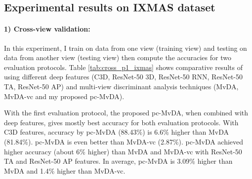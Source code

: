 
\subsection{Experimental results on IXMAS dataset}
    \paragraph{1) Cross-view validation:} In this experiment, I train on data from one view (training view) and testing on data from another view (testing view) then compute the accuracies for two evaluation protocols. Table \ref{tab:cross_p1_ixmas} shows comparative results of using different deep features (C3D, ResNet-50 3D, ResNet-50 RNN, ResNet-50 TA, ResNet-50 AP) and multi-view discriminant analysis techniques (MvDA, MvDA-vc and my proposed pc-MvDA). 

    With the first evaluation protocol, the proposed pc-MvDA, when combined with deep features, gives mostly best accuracy for both evaluation protocols. With C3D features, accuracy by pc-MvDA (88.43\%) is 6.6\% higher than MvDA (81.84\%). pc-MvDA is even better than MvDA-vc (2.87\%). pc-MvDA achieved higher accuracy (about 6\% higher) than MvDA and MvDA-vc with ResNet-50 TA and ResNet-50 AP features. In average, pc-MvDA is 3.09\% higher than MvDA and 1.4\% higher than MvDA-vc.
    
    \begin{table}[htbp]
    \centering
    \caption{Cross-view recognition comparison on IXMAS dataset}
    \label{tab:cross_p1_ixmas}
    \end{table}

